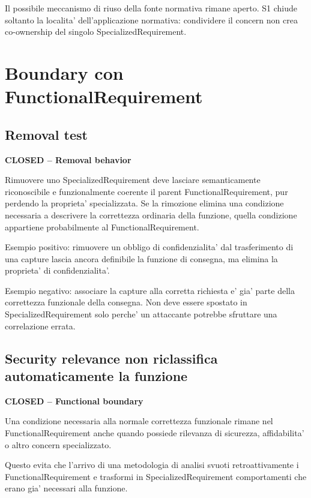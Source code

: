 \documentclass[11pt,a4paper]{article}
\newcommand{\closed}{\textbf{CLOSED}}
\newenvironment{statusbox}[1]{%
  \def\FrameCommand{\fcolorbox{ddtablue}{ddtagray}}%
  \MakeFramed{\advance\hsize-2\width\FrameRestore}
  \noindent\textbf{#1}\par\smallskip
}{\endMakeFramed}
\begin{document}
Il possibile meccanismo di riuso della fonte normativa rimane aperto. S1 chiude soltanto la localita' dell'applicazione normativa: condividere il concern non crea co-ownership del singolo SpecializedRequirement.

\section{Boundary con FunctionalRequirement}

\subsection{Removal test}

\begin{statusbox}{\closed{} -- Removal behavior}
Rimuovere uno SpecializedRequirement deve lasciare semanticamente riconoscibile e funzionalmente coerente il parent FunctionalRequirement, pur perdendo la proprieta' specializzata. Se la rimozione elimina una condizione necessaria a descrivere la correttezza ordinaria della funzione, quella condizione appartiene probabilmente al FunctionalRequirement.
\end{statusbox}

Esempio positivo: rimuovere un obbligo di confidenzialita' dal trasferimento di una capture lascia ancora definibile la funzione di consegna, ma elimina la proprieta' di confidenzialita'.

Esempio negativo: associare la capture alla corretta richiesta e' gia' parte della correttezza funzionale della consegna. Non deve essere spostato in SpecializedRequirement solo perche' un attaccante potrebbe sfruttare una correlazione errata.

\subsection{Security relevance non riclassifica automaticamente la funzione}

\begin{statusbox}{\closed{} -- Functional boundary}
Una condizione necessaria alla normale correttezza funzionale rimane nel FunctionalRequirement anche quando possiede rilevanza di sicurezza, affidabilita' o altro concern specializzato.
\end{statusbox}

Questo evita che l'arrivo di una metodologia di analisi svuoti retroattivamente i FunctionalRequirement e trasformi in SpecializedRequirement comportamenti che erano gia' necessari alla funzione.
\end{document}
